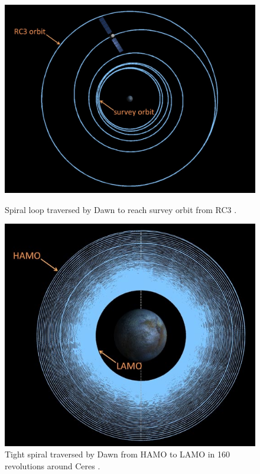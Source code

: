 \begin{figure}[h]
\begin{minipage}[t]{0.45\linewidth}
\centering
\includegraphics[width=\textwidth]{rc32survey.jpg}
\caption{Spiral loop traversed by Dawn to reach survey orbit from \gls{RC3} \cite{dawnblog2}.}
\label{fig:rc32survey}
\end{minipage}
\hspace{0.5cm}
\begin{minipage}[t]{0.45\linewidth}
\centering
\includegraphics[width=\textwidth]{hamo2lamo.jpg}
\caption{Tight spiral traversed by Dawn from \gls{HAMO} to \gls{LAMO} in 160 revolutions around Ceres \cite{dawnblog2}.}
\label{fig:hamo2lamo}
\end{minipage}
\end{figure}

